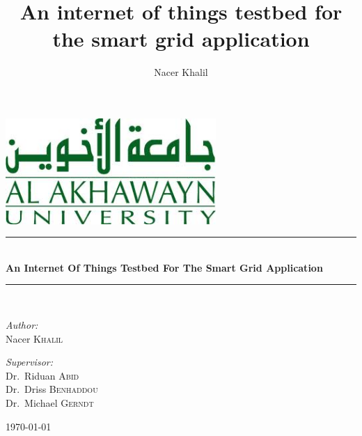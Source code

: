 \documentclass[12pt,a4paper,final]{report}
\author{Nacer Khalil}
\title{An internet of things testbed for the smart grid application}
\newcommand{\HRule}{\rule{\linewidth}{0.5mm}}
\begin{document}
\begin{titlepage}
\begin{center}
\includegraphics[width=0.6\textwidth]{img/aui_logo.jpg}
\linebreak
\linebreak
\linebreak
\linebreak
\linebreak
\linebreak
\HRule \\[0.4cm]
{ \huge \bfseries An Internet Of Things Testbed For The Smart Grid Application}\\[0.4cm]

\HRule \\[1.5cm]

\begin{minipage}{0.4\textwidth}
\begin{flushleft} \large
\emph{Author:}\\
Nacer \textsc{Khalil}
\end{flushleft}
\end{minipage}
\begin{minipage}{0.4\textwidth}
\begin{flushright} \large
\emph{Supervisor:} \\
Dr.~Riduan \textsc{Abid} \\
Dr.~Driss \textsc{Benhaddou} \\
Dr.~Michael \textsc{Gerndt} 
\end{flushright}
\end{minipage}

\vfill

{\large \today}

\end{center}
\end{titlepage}


\begin{abstract}

\end{abstract}
\end{document}
